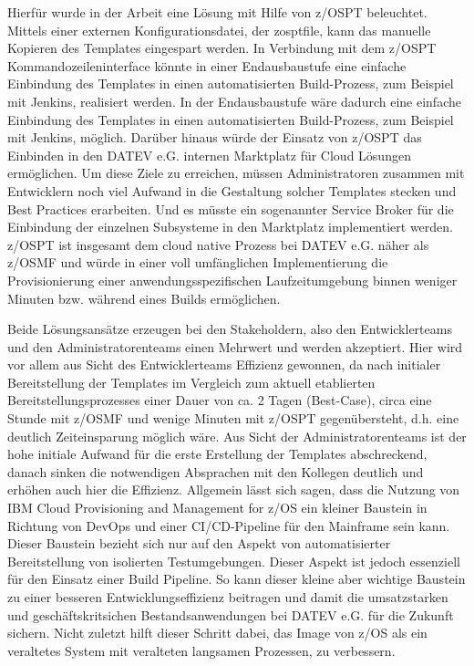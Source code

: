 Hierfür wurde in der Arbeit eine Lösung mit Hilfe von z/OSPT beleuchtet.
Mittels einer externen Konfigurationsdatei, der \glqq zosptfile\grqq, kann das manuelle Kopieren des Templates eingespart werden.
In Verbindung mit dem z/OSPT Kommandozeileninterface könnte in einer Endausbaustufe eine einfache Einbindung des Templates in einen automatisierten Build-Prozess, zum Beispiel mit Jenkins, realisiert werden.
In der Endausbaustufe wäre dadurch eine einfache Einbindung des Templates in einen automatisierten Build-Prozess, zum Beispiel mit Jenkins, möglich.
Darüber hinaus würde der Einsatz von z/OSPT das Einbinden in den DATEV e.G. internen \glqq Marktplatz\grqq{} für Cloud Lösungen ermöglichen.
Um diese Ziele zu erreichen, müssen Administratoren zusammen mit Entwicklern noch viel Aufwand in die Gestaltung solcher Templates stecken und Best Practices erarbeiten.
Und es müsste ein sogenannter \glqq Service Broker\grqq{} für die Einbindung der einzelnen Subsysteme in den \glqq Marktplatz\grqq{} implementiert werden.
z/OSPT ist insgesamt dem cloud native Prozess bei DATEV e.G. näher als z/OSMF und würde in einer voll umfänglichen Implementierung die Provisionierung einer anwendungsspezifischen Laufzeitumgebung binnen weniger Minuten bzw. während eines Builds ermöglichen.

Beide Lösungsansätze erzeugen bei den Stakeholdern, also den Entwicklerteams und den Administratorenteams einen Mehrwert und werden akzeptiert.
Hier wird vor allem aus Sicht des Entwicklerteams Effizienz gewonnen, da nach initialer Bereitstellung der Templates im Vergleich zum aktuell etablierten Bereitstellungsprozesses einer Dauer von ca. 2 Tagen (\glqq Best-Case\grqq), circa eine Stunde mit z/OSMF und wenige Minuten mit z/OSPT gegenübersteht, d.h. eine deutlich Zeiteinsparung möglich wäre.
Aus Sicht der Administratorenteams ist der hohe initiale Aufwand für die erste Erstellung der Templates abschreckend, danach sinken die notwendigen Absprachen mit den Kollegen deutlich und erhöhen auch hier die Effizienz.
Allgemein lässt sich sagen, dass die Nutzung von \glqq IBM Cloud Provisioning and Management for z/OS\grqq{} ein kleiner Baustein in Richtung von DevOps und einer CI/CD-Pipeline für den Mainframe sein kann.
Dieser Baustein bezieht sich nur auf den Aspekt von automatisierter Bereitstellung von isolierten Testumgebungen.
Dieser Aspekt ist jedoch essenziell für den Einsatz einer Build Pipeline.
So kann dieser kleine aber wichtige Baustein zu einer besseren Entwicklungseffizienz beitragen und damit die umsatzstarken und geschäftskritsichen Bestandsanwendungen bei DATEV e.G. für die Zukunft sichern.
Nicht zuletzt hilft dieser Schritt dabei, das Image von z/OS als ein veraltetes System mit veralteten langsamen Prozessen, zu verbessern.

